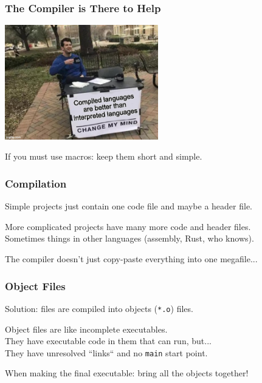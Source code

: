 \begin{frame}
\frametitle{The Compiler is There to Help}

\begin{center}
  \includegraphics[width=0.5\textwidth]{images/compiled.jpg}
\end{center}

If you must use macros: keep them short and simple.

\end{frame}

\begin{frame}
\frametitle{Compilation}

Simple projects just contain one code file and maybe a header file.

More complicated projects have many more code and header files.\\
\quad Sometimes things in other languages (assembly, Rust, who knows).

The compiler doesn't just copy-paste everything into one megafile...

\end{frame}

\begin{frame}
\frametitle{Object Files}

Solution: files are compiled into objects (\texttt{*.o}) files.

Object files are like incomplete executables.\\
\quad They have executable code in them that can run, but...\\
\quad They have unresolved ``links`` and no \texttt{main} start point.

When making the final executable: bring all the objects together!

\end{frame}

